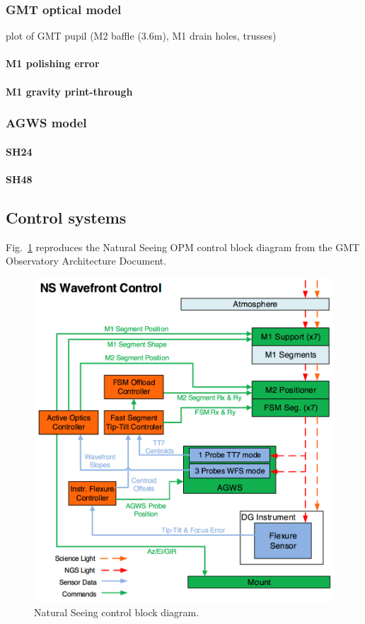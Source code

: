 \documentclass{gmto}
\begin{document}
\subsubsection{GMT optical model}
\label{sec:gom}

plot of GMT pupil (M2 baffle (3.6m), M1 drain holes, trusses)

\paragraph{M1 polishing error}

\paragraph{M1 gravity print-through}

\subsubsection{AGWS model}
\label{sec:agws}

\paragraph{SH24}

\paragraph{SH48}

\clearpage
\subsection{Control systems}
\label{sec:control}

Fig.~\ref{fig:ns-ctrl} reproduces the Natural Seeing OPM control block diagram
from the GMT Observatory Architecture Document\cite{OAD}.
\begin{figure}
  \centering
  \includegraphics[width=0.8\linewidth]{ns-control.png}
  \caption{Natural Seeing control block diagram.}
  \label{fig:ns-ctrl}
\end{figure}
\end{document}
